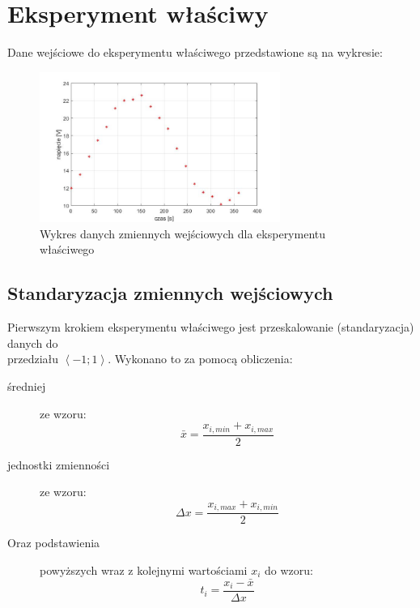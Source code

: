 \documentclass[a4paper, 12pt]{mwart}
\begin{document}
	\newpage
	\section{Eksperyment właściwy}
		Dane wejściowe do eksperymentu właściwego przedstawione są na wykresie:
		\begin{figure}[h]
			\begin{center}
				\includegraphics[width = 0.7\textwidth]{graphs/2A.jpg}
				\caption{Wykres danych zmiennych wejściowych dla eksperymentu właściwego}
				\label{fig:2A}
			\end{center}
		\end{figure}

		\subsection{Standaryzacja zmiennych wejściowych}
			Pierwszym krokiem eksperymentu właściwego jest przeskalowanie (standaryzacja)
			danych do\\ przedziału $\left\langle -1; 1 \right\rangle$. Wykonano to za pomocą obliczenia:
			\begin{description}
				\item[średniej] ze wzoru:
					$$\bar{x} = \frac{x_{i,min} + x_{i,max}}{2}$$
				\item[jednostki zmienności] ze wzoru:
					$$\Delta x = \frac{x_{i,max} + x_{i,min}}{2}$$
				\item[Oraz podstawienia] powyższych wraz z kolejnymi wartościami $x_i$ do wzoru:
					$$t_i = \frac{x_i - \bar{x}}{\Delta x}$$
			\end{description}
			
\end{document}
